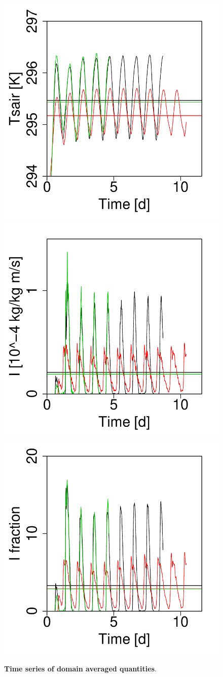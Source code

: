 \documentclass[draft,linenumbers]{agujournal2019}
\begin{document}
\begin{figure}
\centering
\includegraphics[trim={0 0 0cm 0}, clip, height=0.32\linewidth]{tsair_timeseries.pdf}
\includegraphics[trim={0 0 0cm 0}, clip, height=0.32\linewidth]{prcp_timeseries.pdf}
\includegraphics[trim={0 0 0cm 0}, clip, height=0.32\linewidth]{pfrac_timeseries.pdf}
\caption{{\bf Time series of domain averaged quantities}. }
\label{fig:domain_mean_timeseries}
\end{figure}
\end{document}

